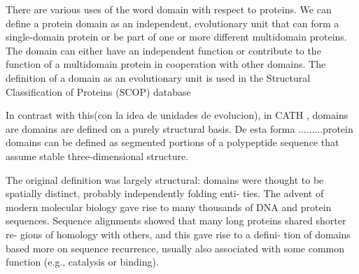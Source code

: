 


There are various uses of the word domain with respect to proteins. 
We can define a protein domain as an independent, evolutionary unit that can form a single-domain protein or be part of one or more different multidomain proteins. The domain can either have an independent
function or contribute to the function of a multidomain protein in cooperation with other domains. 
The definition of a domain as an evolutionary unit is used in the Structural Classification of Proteins (SCOP) database \cite{murzin1995scop}



In contrast with this(con la idea de unidades de evolucion), in CATH \cite{orengo1997cath}, domains are domains are defined on a purely structural basis.
De esta forma .........protein domains can be defined as segmented portions of a polypeptide sequence that assume stable three-dimensional structure.

The original definition was largely structural: domains were thought
to be spatially distinct, probably independently folding enti-
ties. The advent of modern molecular biology gave rise to
many thousands of DNA and protein sequences. Sequence
alignments showed that many long proteins shared shorter re-
gions of homology with others, and this gave rise to a defini-
tion of domains based more on sequence recurrence, usually
also associated with some common function (e.g., catalysis
or binding). 








